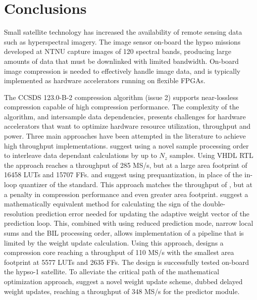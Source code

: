 \chapter{Conclusions}
\label{sec:conclusion}

Small satellite technology has increased the availability of remote sensing data such as hyperspectral imagery. The image sensor on-board the \acrshort{hypso} missions developed at \acrshort{NTNU} capture images of 120 spectral bands, producing large amounts of data that must be downlinked with limited bandwidth. On-board image compression is needed to effectively handle image data, and is typically implemented as hardware accelerators running on flexible \acrshort{FPGA}s.

The CCSDS 123.0-B-2 compression algorithm (issue 2) supports near-lossless compression capable of high compression performance. The complexity of the algorithm, and intersample data dependencies, presents challenges for hardware accelerators that want to optimize hardware resource utilization, throughput and power. Three main approaches have been attempted in the literature to achieve high throughput implementations. \citeauthor{basconesRealTimeFPGAImplementation2022} suggest using a novel sample processing order to interleave data dependant calculations by up to $N_z$ samples. Using VHDL \acrshort{RTL} the approach reaches a throughput of 285 MS/s, but at a large area footprint of 16458 \acrshort{LUT}s and 15707 \acrshort{FF}s. \citeauthor{chatziantoniouScalableDataRateNearLossless2022a} and \citeauthor{valsesiaHighThroughputOnboardHyperspectral2019} suggest using prequantization, in place of the in-loop quantizer of the standard. This approach matches the throughput of \citeauthor{basconesRealTimeFPGAImplementation2022}, but at a penalty in compression performance and even greater area footprint. \citeauthor{sanchezReducingDataDependencies2022} suggest a mathematically equivalent method for calculating the sign of the double-resolution prediction error needed for updating the adaptive weight vector of the prediction loop. This, combined with using reduced prediction mode, narrow local sums and the \acrshort{BIL} processing order, allows implementation of a pipeline that is limited by the weight update calculation. Using this approach, \citeauthor{vorhaugHyperspectralImageCompression2024} designs a compression core reaching a throughput of 110 MS/s with the smallest area footprint at 5577 \acrshort{LUT}s and 2635 \acrshort{FF}s. The design is successfully tested on-board the \acrshort{hypso}-1 satellite. To alleviate the critical path of the mathematical optimization approach, \citeauthor{jiaRemovalFeedbackLoop2025} suggest a novel weight update scheme, dubbed delayed weight updates, reaching a throughput of 348 MS/s for the predictor module.

